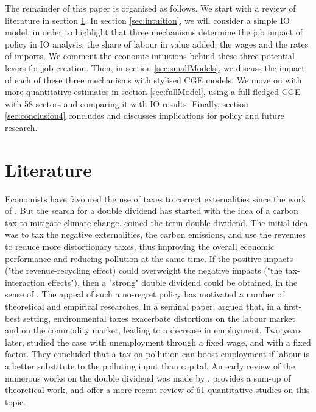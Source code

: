 The remainder of this paper is organised as follows.
We start with a review of literature in section \ref{sec:literature}. In section \ref{sec:intuition}, we will consider a simple IO model, in order to highlight that three mechanisms determine the job impact of policy in IO analysis: the share of labour in value added, the wages and the rates of imports. We comment the economic intuitions behind these three potential levers for job creation.
Then, in section  \ref{sec:smallModels}, we discuss the impact of each of these three mechanisms with stylised CGE models.
We move on with more quantitative estimates in section \ref{sec:fullModel}, using a full-fledged CGE with 58 sectors and comparing it with IO results.
Finally, section \ref{sec:conclusion4} concludes and discusses implications for policy and future research.



\section{Literature} \label{sec:literature}

Economists have favoured the use of taxes to correct externalities since the work of \citet{Pigou1920}.
But the search for a double dividend has started with the idea of a carbon tax to mitigate climate change. \citet{Pearce1991} coined the term double dividend.
The initial idea was to tax the negative externalities, the carbon emissions, and use the revenues to reduce more distortionary taxes, thus improving the overall economic performance and reducing pollution at the same time. If the positive impacts ("the revenue-recycling effect) could overweight the negative impacts ("the tax-interaction effects"), then a "strong" double dividend could be obtained, in the sense of \citet{Goulder1994}.
The appeal of such a no-regret policy has motivated a number of theoretical and empirical researches. 
In a seminal paper, \citet{Bovenberg1994a} argued that, in a first-best setting, environmental taxes exacerbate distortions on the labour market and on the commodity market, leading to a decrease in employment.
Two years later, \citet{Bovenberg1996} studied the case with unemployment through a fixed wage, and with a fixed factor. They concluded that a tax on pollution can boost employment if labour is a better substitute to the polluting input than capital. 
An early review of the numerous works on the double dividend was made by \citet{Goulder1994}. \citet{Chiroleu-Assouline2001} provides a sum-up of theoretical work, and \citet{Patuelli2005} offer a more recent review of 61 quantitative studies on this topic.

